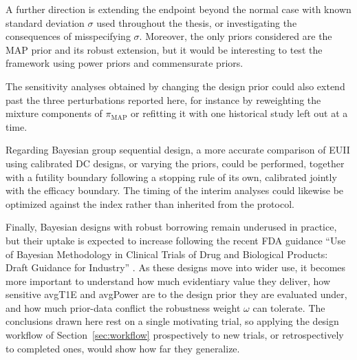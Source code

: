 A further direction is extending the endpoint beyond the normal case with known standard
deviation $\sigma$ used throughout the thesis, or investigating the consequences of misspecifying
$\sigma$. Moreover, the only priors considered are the MAP prior and its robust extension, but it
would be interesting to test the framework using power priors and commensurate priors.



The sensitivity analyses obtained by changing the design prior could also extend past the three
perturbations reported here, for instance by reweighting the mixture components of
$\pi_{\text{MAP}}$ or refitting it with one historical study left out at a time.

Regarding Bayesian group sequential design, a more accurate comparison of EUII using calibrated DC
designs, or varying the priors, could be performed, together with a futility boundary following a stopping rule of
its own, calibrated jointly with the efficacy boundary. The timing of the interim analyses could
likewise be optimized against the index rather than inherited from the protocol.

Finally, Bayesian designs with robust borrowing remain underused in practice, but their uptake is
expected to increase following the recent FDA guidance ``Use of Bayesian Methodology in Clinical
Trials of Drug and Biological Products: Draft Guidance for Industry'' \citep{fda_bayesian_2026}. As
these designs move into wider use, it becomes more important to understand how much evidentiary value they
deliver, how sensitive avgT1E and avgPower are to the design prior they are evaluated under, and how much prior-data conflict the
robustness weight $\omega$ can tolerate. The conclusions drawn here rest on a single motivating trial, so applying the design
workflow of Section~\ref{sec:workflow} prospectively to new trials, or retrospectively to completed
ones, would show how far they generalize.


